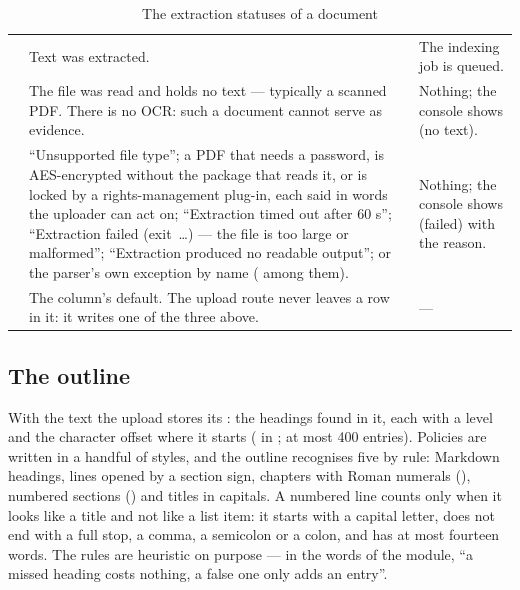 \begin{table}[H]
\caption{The extraction statuses of a document}\label{tab:company:status}
\begin{tabularx}{\textwidth}{@{}L{17mm}YL{50mm}@{}}
\toprule
{} &  &  \\
\midrule
{} & Text was extracted. & The indexing job is queued. \\
 & The file was read and holds no text --- typically a scanned PDF. There is no
  OCR: such a document cannot serve as evidence. & Nothing; the console shows 
  (no text). \\
 & \enquote{Unsupported file type}; a PDF that needs a password, is AES-encrypted
  without the package that reads it, or is locked by a rights-management plug-in, each said in
  words the uploader can act on; \enquote{Extraction timed out after 60 s};
  \enquote{Extraction failed (exit~\ldots) --- the file is too large or malformed};
  \enquote{Extraction produced no readable output}; or the parser's own exception by name
  ( among them). & Nothing; the console shows  (failed) with the
  reason. \\
 & The column's default. The upload route never leaves a row in it: it writes
  one of the three above. & --- \\
\bottomrule
\end{tabularx}
\end{table}

\subsection{The outline}\label{sec:company:outline}

With the text the upload stores its : the headings found in it, each with a
level and the character offset where it starts ( in
; at most 400 entries). Policies are written in a handful of
styles, and the outline recognises five by rule: Markdown headings, lines opened by a section
sign, chapters with Roman numerals (), numbered sections
() and titles in capitals. A numbered line counts only when it
looks like a title and not like a list item: it starts with a capital letter, does not end
with a full stop, a comma, a semicolon or a colon, and has at most fourteen words. The rules are heuristic
on purpose --- in the words of the module, \enquote{a missed heading costs nothing, a false
one only adds an entry}.

